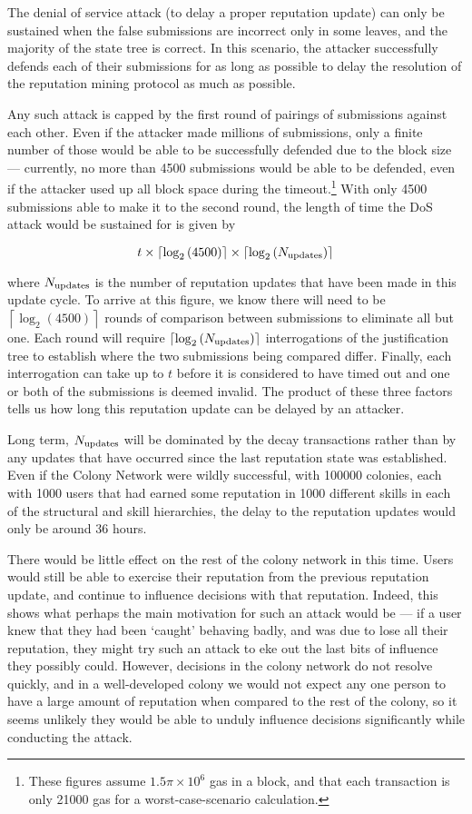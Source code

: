 The denial of service attack (to delay a proper reputation update) can only be sustained when the false submissions are incorrect only in some leaves, and the majority of the state tree is correct. In this scenario, the attacker successfully defends each of their submissions for as long as possible to delay the resolution of the reputation mining protocol as much as possible.

Any such attack is capped by the first round of pairings of submissions against each other. Even if the attacker made millions of submissions, only a finite number of those would be able to be successfully defended due to the block size --- currently, no more than 4500 submissions would be able to be defended, even if the attacker used up all block space during the timeout.\footnote{These figures assume $1.5\pi\times10^6$ gas in a block, and that each transaction is only 21000 gas for a worst-case-scenario calculation.} With only 4500 submissions able to make it to the second round, the length of time the DoS attack would be sustained for is given by 

$$t \times \left\lceil\log_2\left(4500\right)\right\rceil\times \left\lceil\log_2\left(N_{\rm updates}\right)\right\rceil$$

\noindent where $N_{\rm updates}$ is the number of reputation updates that have been made in this update cycle. To arrive at this figure, we know there will need to be $\left\lceil\log_2\left(4500\right)\right\rceil$ rounds of comparison between submissions to eliminate all but one. Each round will require $\left\lceil\log_2\left(N_{\rm updates}\right)\right\rceil$ interrogations of the justification tree to establish where the two submissions being compared differ. Finally, each interrogation can take up to $t$ before it is considered to have timed out and one or both of the submissions is deemed invalid. The product of these three factors tells us how long this reputation update can be delayed by an attacker.

Long term, $N_{\rm updates}$ will be dominated by the decay transactions rather than by any updates that have occurred since the last reputation state was established. Even if the Colony Network were wildly successful, with 100000 colonies, each with 1000 users that had earned some reputation in 1000 different skills in each of the structural and skill hierarchies, the delay to the reputation updates would only be around $36$ hours.

There would be little effect on the rest of the colony network in this time. Users would still be able to exercise their reputation from the previous reputation update, and continue to influence decisions with that reputation. Indeed, this shows what perhaps the main motivation for such an attack would be --- if a user knew that they had been `caught' behaving badly, and was due to lose all their reputation, they might try such an attack to eke out the last bits of influence they possibly could. However, decisions in the colony network do not resolve quickly, and in a well-developed colony we would not expect any one person to have a large amount of reputation when compared to the rest of the colony, so it seems unlikely they would be able to unduly influence decisions significantly while conducting the attack.

